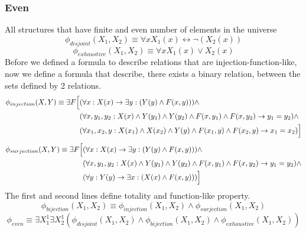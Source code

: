 \documentclass{article}
\begin{document}
\subsubsection{Even}
All structures that have finite and even number of elements in the universe
\[\phi_{disjoint}(X_1, X_2) \equiv \forall x X_1(x) \leftrightarrow \neg (X_2(x))\] 
\[\phi_{exhaustive}(X_1, X_2) \equiv \forall x X_1(x) \lor X_2(x)\]
Before we defined a formula to describe relations that are injection-function-like, now we define a formula that describe, there exists a binary relation, between the sets defined by 2 relations.
$$\begin{aligned}
\phi_{injection}(X, Y) \equiv \exists F \Bigl[
& (\forall x : X(x) \rightarrow \exists y : (Y(y) \land F(x, y))) \land \\
& (\forall x, y_1, y_2 : X(x) \land Y(y_1) \land Y(y_2) \land F(x, y_1) \land F(x, y_2) \rightarrow y_1 = y_2) \land \\
& (\forall x_1, x_2, y : X(x_1) \land X(x_2) \land Y(y) \land F(x_1, y) \land F(x_2, y) \rightarrow x_1 = x_2) \Bigr]
\end{aligned}$$
$$\begin{aligned}
\phi_{surjection}(X, Y) \equiv \exists F \Bigl[ 
& (\forall x : X(x) \rightarrow \exists y : (Y(y) \land F(x, y))) \land \\
& (\forall x, y_1, y_2 : X(x) \land Y(y_1) \land Y(y_2) \land F(x, y_1) \land F(x, y_2) \rightarrow y_1 = y_2) \land \\
& (\forall y : Y(y) \rightarrow \exists x : (X(x) \land F(x, y))) \Bigr]
\end{aligned}$$
The first and second lines define totality and function-like property.
\[\phi_{bijection}(X_1, X_2) \equiv \phi_{injection}(X_1, X_2) \land \phi_{surjection}(X_1, X_2)\]
\[\phi_{even} \equiv \exists X^1_1 \exists X^1_2 (\phi_{disjoint}(X_1, X_2) \land \phi_{bijection}(X_1, X_2) \land \phi_{exhaustive}(X_1, X_2))\]
\end{document}
